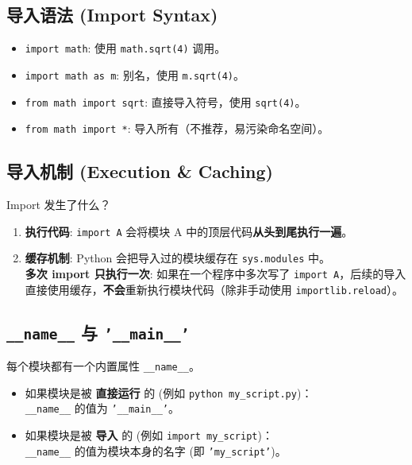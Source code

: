 \documentclass[12pt, a4paper]{article}
\begin{document}
\subsection{导入语法 (Import Syntax)}

\begin{itemize}
    \item \texttt{import math}: 使用 \texttt{math.sqrt(4)} 调用。
    \item \texttt{import math as m}: 别名，使用 \texttt{m.sqrt(4)}。
    \item \texttt{from math import sqrt}: 直接导入符号，使用 \texttt{sqrt(4)}。
    \item \texttt{from math import *}: 导入所有（不推荐，易污染命名空间）。
\end{itemize}

\subsection{导入机制 (Execution \& Caching)}

\begin{importantbox}{Import 发生了什么？}
\begin{enumerate}
    \item \textbf{执行代码}: \texttt{import A} 会将模块 A 中的顶层代码\textbf{从头到尾执行一遍}。
    \item \textbf{缓存机制}: Python 会把导入过的模块缓存在 \texttt{sys.modules} 中。
    \\ \textbf{多次 import 只执行一次}: 如果在一个程序中多次写了 \texttt{import A}，后续的导入直接使用缓存，\textbf{不会}重新执行模块代码（除非手动使用 \texttt{importlib.reload}）。
\end{enumerate}
\end{importantbox}

\subsection{\texttt{\_\_name\_\_} 与 \texttt{'\_\_main\_\_'}}

每个模块都有一个内置属性 \texttt{\_\_name\_\_}。

\begin{itemize}
    \item 如果模块是被 \textbf{直接运行} 的 (例如 \texttt{python my\_script.py})：
    \\ \texttt{\_\_name\_\_} 的值为 \texttt{'\_\_main\_\_'}。
    \item 如果模块是被 \textbf{导入} 的 (例如 \texttt{import my\_script})：
    \\ \texttt{\_\_name\_\_} 的值为模块本身的名字 (即 \texttt{'my\_script'})。
\end{itemize}
\end{document}
